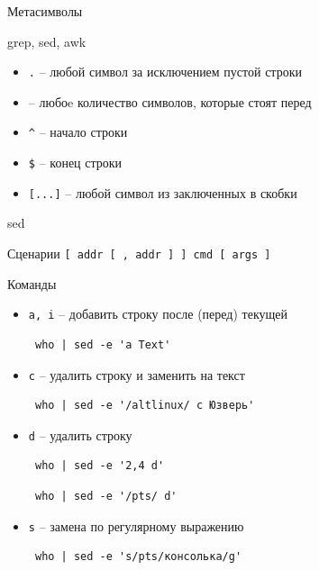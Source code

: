 \documentclass[ignorenonframetext, professionalfonts, hyperref={pdftex, unicode}]{beamer}
\begin{document}
\begin{frame}[fragile]{Метасимволы}
	\begin{block}{grep, sed, awk}
	\end{block}
	\begin{itemize}
		\item {\tt .} -- любой символ за исключением пустой строки
		\item {\tt *} -- любоe количество символов, которые стоят перед {\tt *}
		\item {\tt \^{}} -- начало строки
		\item {\tt \$} -- конец строки
		\item {\tt [...]} -- любой символ из заключенных в скобки
	\end{itemize}
\end{frame}

\begin{frame}[fragile]{sed}
	\begin{block}{Сценарии}
		{\tt [ addr [ ,  addr ] ] cmd [ args ]}
	\end{block}

	\small
	\begin{block}{Команды}
		\begin{itemize}
		  \item {\tt a, i} -- добавить строку после (перед) текущей
			  \begin{verbatim} who | sed -e 'a Text' \end{verbatim}
		  \item {\tt c} -- удалить строку и заменить на текст
			  \begin{verbatim} who | sed -e '/altlinux/ c Юзверь' \end{verbatim}
		  \item {\tt d} -- удалить строку
			  \begin{verbatim} who | sed -e '2,4 d' \end{verbatim}
			  \begin{verbatim} who | sed -e '/pts/ d' \end{verbatim}
		  \item {\tt s} -- замена по регулярному выражению
			  \begin{verbatim} who | sed -e 's/pts/консолька/g' \end{verbatim}
		\end{itemize}
	\end{block}
\end{frame}
\end{document}
